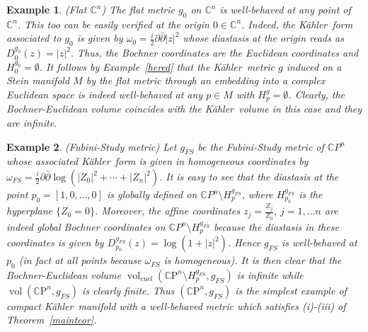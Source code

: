\documentclass[12pt]{amsart}
\newcommand{\CP}{\mathbb{C}\mathrm{P}}
\newcommand{\C}{\mathbb{C}}
\newcommand{\K}{K\"{a}hler}
\newcommand{\vol}{{\operatorname{vol}}}
\newtheorem{ex}{Example}
\begin{document}
\begin{ex}\rm\label{flatmetric} (Flat $\C^n$)
	The flat metric $g_0$ on $\C^n$ is well-behaved at any point of $\C ^n$.
	This too can be easily verified at the origin $0\in \C^n$.
	Indeed, the \K\ form  associated to $g_{0}$ is given by $\omega_{0}=\frac{i}{2}\partial\bar\partial |z|^2$
	whose diastasis at the origin reads as $D_0^{g_{0}}(z)=|z|^2$. Thus, the Bochner coordinates
	are the Euclidean coordinates  and $H_0^{g_0}=\emptyset$.
	It follows by Example~\ref{hered} that the \K\ metric $g$ induced on a Stein manifold $M$ by the flat metric
	through an  embedding into a complex Euclidean space is  indeed well-behaved at any $p\in M$ with $H_p^g=\emptyset$.
	Clearly, the Bochner-Euclidean volume coincides with the \K\ volume in this case and they are infinite.
	
\end{ex}
\begin{ex}\rm\label{projspace} (Fubini-Study metric)
	Let $g_{FS}$ be the Fubini-Study metric of $\C P^n$ whose associated \K\ form is given in homogeneous coordinates by $\omega_{FS}=\frac{i}{2}\partial\bar\partial\log (|Z_0|^2+\cdots +|Z_n|^2)$.
	It is easy to see that  the diastasis at the point $p_0=[1, 0, \dots , 0]$ is globally defined on $\C P^n\setminus H^{g_{FS}}_p$, where 
	$H_{p_0}^{g_{FS}}$ is the hyperplane $\{Z_0=0\}$.
	Moreover,  the  affine coordinates $z_j=\frac{Z_j}{Z_0}$, $j=1, \dots n$ are indeed global  Bochner coordinates on $\C P^n\setminus H^{g_{FS}}_p$ because the diastasis in these coordinates is given by
	$D_{p_0}^{g_{FS}}(z)=\log (1+|z|^2)$.
	Hence $g_{FS}$ is well-behaved at $p_0$ (in fact at all points because $\omega_{FS}$ is homogeneous).
	It is then clear that the Bochner-Euclidean volume $\vol_{eucl}(\CP^n\setminus H^{g_{FS}}_p,g_{FS})$ is infinite while $\vol(\CP^n,g_{FS})$ is clearly finite.
	Thus $(\CP^n,g_{FS})$ is the simplest example of compact \K\ manifold with a well-behaved metric which satisfies (i)-(iii) of Theorem~\ref{mainteor}.
\end{ex}
\end{document}
